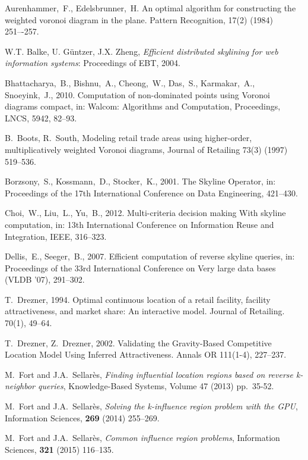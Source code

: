\documentclass[11pt,onecolumn]{elsart3p}
\begin{document}
\begin{thebibliography}{100}


Aurenhammer,~F., Edelsbrunner,~H.  An optimal algorithm for constructing the weighted
voronoi diagram in the plane. Pattern Recognition, 17(2) (1984) 251–-257.

 W.T. Balke, U. G\"untzer, J.X. Zheng, \emph{Efficient distributed skylining for web information systems}:
Proceedings of EBT, 2004.

Bhattacharya,~B., Bishnu,~A., Cheong,~W., Das,~S., Karmakar,~A., Snoeyink,~J., 2010. Computation of non-dominated points using Voronoi diagrams compact, in: Walcom: Algorithms and Computation, Proceedings, LNCS, 5942, 82--93.

B.~Boots, R.~South, Modeling retail trade areas using
higher-order, multiplicatively weighted {V}oronoi diagrams,
Journal of Retailing 73(3) (1997) 519--536.

 Borzsony,~S., Kossmann,~D., Stocker,~K., 2001. The Skyline Operator, in: Proceedings of the 17th International Conference on Data Engineering, 421--430.

 Choi,~W., Liu,~L., Yu,~B., 2012. Multi-criteria decision making With skyline computation,
in: 13th International Conference on Information Reuse and Integration, IEEE, 316--323.


 Dellis,~E., Seeger,~B., 2007. Efficient computation of reverse skyline queries, in:
Proceedings of the 33rd International Conference on Very large data bases (VLDB '07), 291--302.

T.~Drezner, 1994. Optimal continuous location of a retail
facility, facility attractiveness, and market share: An
interactive model. Journal of Retailing. 70(1), 49--64.

T.~Drezner, Z.~Drezner, 2002. Validating the Gravity-Based
Competitive Location Model Using Inferred Attractiveness. Annals
OR 111(1-4), 227--237.

M.~Fort and J.A.~Sellar\`es, \emph{Finding influential location regions based on reverse k-neighbor queries}, Knowledge-Based Systems, Volume 47 (2013)  pp.~35-52.

M.~Fort and J.A.~Sellar\`es, \emph{Solving the k-influence region problem with the GPU},
Information Sciences, \textbf{269} (2014) 255--269.

M.~Fort and J.A.~Sellar\`es, \emph{Common influence region problems},  Information Sciences, \textbf{321} (2015) 116--135.


\end{thebibliography}
\end{document}
